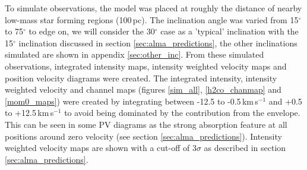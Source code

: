 \documentclass[useAMS,usenatbib]{mn2e}
\begin{document}

To simulate observations, the model was placed at roughly the distance of nearby low-mass star forming regions (100$\,$pc). The inclination angle was varied from 15$^\circ$ to 75$^\circ$ to edge on, we will consider the 30$^\circ$ case as a 'typical' inclination with the 15$^\circ$ inclination discussed in section \ref{sec:alma_predictions}, the other inclinations simulated are shown in appendix \ref{sec:other_inc}. From these simulated observations, integrated intensity maps, intensity weighted velocity maps and position velocity diagrams were created. The integrated intensity, intensity weighted velocity and channel maps (figures \ref{sim_all}, \ref{h2co_chanmap} and \ref{mom0_maps}) were created by integrating between -12.5 to -0.5$\,$km$\,$s$^{-1}$ and +0.5 to +12.5$\,$km$\,$s$^{-1}$ to avoid being dominated by the contribution from the envelope. This can be seen in some PV diagrams as the strong absorption feature at all positions around zero velocity (see section \ref{sec:alma_predictions}). Intensity weighted velocity maps are shown with a cut-off of 3$\sigma$ as described in section \ref{sec:alma_predictions}.\smallskip
\end{document}
